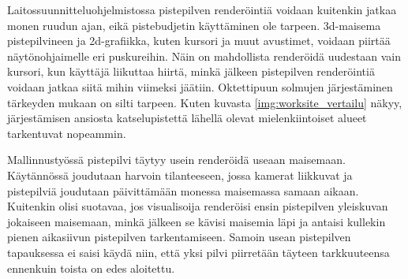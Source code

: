 Laitossuunnitteluohjelmistossa pistepilven renderöintiä voidaan kuitenkin jatkaa monen ruudun ajan, eikä pistebudjetin käyttäminen ole tarpeen. 3d-maisema pistepilvineen ja 2d-grafiikka, kuten kursori ja muut avustimet, voidaan piirtää näytönohjaimelle eri puskureihin. Näin on mahdollista renderöidä uudestaan vain kursori, kun käyttäjä liikuttaa hiirtä, minkä jälkeen pistepilven renderöintiä voidaan jatkaa siitä mihin viimeksi jäätiin. Oktettipuun solmujen järjestäminen tärkeyden mukaan on silti tarpeen. Kuten kuvasta \ref{img:worksite_vertailu} näkyy, järjestämisen ansiosta katselupistettä lähellä olevat mielenkiintoiset alueet tarkentuvat nopeammin.

Mallinnustyössä pistepilvi täytyy usein renderöidä useaan maisemaan. Käytännössä joudutaan harvoin tilanteeseen, jossa kamerat liikkuvat ja pistepilviä joudutaan päivittämään monessa maisemassa samaan aikaan. Kuitenkin olisi suotavaa, jos visualisoija renderöisi ensin pistepilven yleiskuvan jokaiseen maisemaan, minkä jälkeen se kävisi maisemia läpi ja antaisi kullekin pienen aikasiivun pistepilven tarkentamiseen. Samoin usean pistepilven tapauksessa ei saisi käydä niin, että yksi pilvi piirretään täyteen tarkkuuteensa ennenkuin toista on edes aloitettu. 

